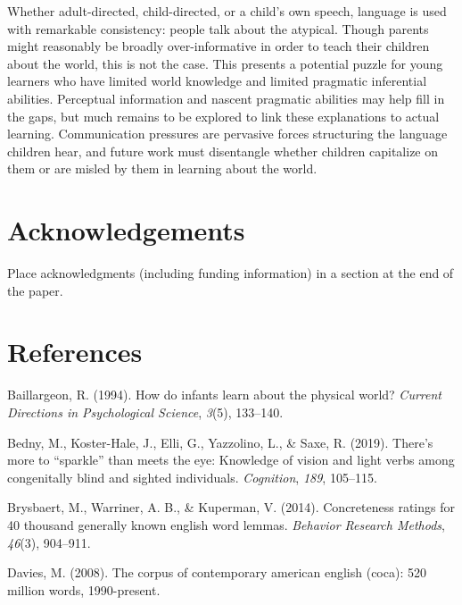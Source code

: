 \documentclass[10pt, letterpaper]{article}
\begin{document}
Whether adult-directed, child-directed, or a child's own speech,
language is used with remarkable consistency: people talk about the
atypical. Though parents might reasonably be broadly over-informative in
order to teach their children about the world, this is not the case.
This presents a potential puzzle for young learners who have limited
world knowledge and limited pragmatic inferential abilities. Perceptual
information and nascent pragmatic abilities may help fill in the gaps,
but much remains to be explored to link these explanations to actual
learning. Communication pressures are pervasive forces structuring the
language children hear, and future work must disentangle whether
children capitalize on them or are misled by them in learning about the
world.

\hypertarget{acknowledgements}{%
\section{Acknowledgements}\label{acknowledgements}}

Place acknowledgments (including funding information) in a section at
the end of the paper.

\hypertarget{references}{%
\section{References}\label{references}}

\setlength{\parindent}{-0.1in} 
\setlength{\leftskip}{0.125in}

\noindent

\hypertarget{refs}{}
\leavevmode\hypertarget{ref-baillargeon1994}{}%
Baillargeon, R. (1994). How do infants learn about the physical world?
\emph{Current Directions in Psychological Science}, \emph{3}(5),
133--140.

\leavevmode\hypertarget{ref-bedny2019}{}%
Bedny, M., Koster-Hale, J., Elli, G., Yazzolino, L., \& Saxe, R. (2019).
There's more to ``sparkle'' than meets the eye: Knowledge of vision and
light verbs among congenitally blind and sighted individuals.
\emph{Cognition}, \emph{189}, 105--115.

\leavevmode\hypertarget{ref-brysbaert2014}{}%
Brysbaert, M., Warriner, A. B., \& Kuperman, V. (2014). Concreteness
ratings for 40 thousand generally known english word lemmas.
\emph{Behavior Research Methods}, \emph{46}(3), 904--911.

\leavevmode\hypertarget{ref-davies2008}{}%
Davies, M. (2008). The corpus of contemporary american english (coca):
520 million words, 1990-present.
\end{document}
